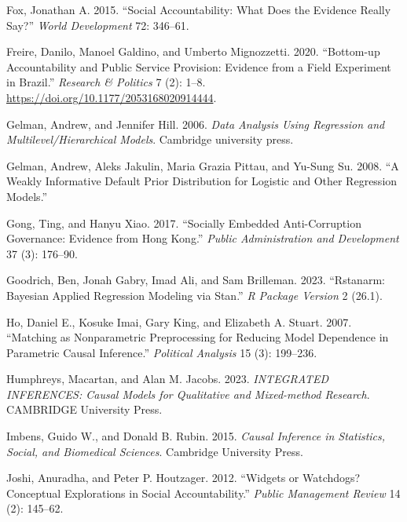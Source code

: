 \documentclass[]{AEA}
\newlength{\cslhangindent}
\newlength{\cslentryspacingunit} %
\newenvironment{CSLReferences}[2] %
 {%
  \setlength{\parindent}{0pt}
  \ifodd #1
  \let\oldpar\par
  \def\par{\hangindent=\cslhangindent\oldpar}
  \fi
  \setlength{\parskip}{#2\cslentryspacingunit}
 }%
 {}
\begin{document}
\begin{CSLReferences}{1}{0}
\leavevmode{}%
Fox, Jonathan A. 2015. {``Social Accountability: What Does the Evidence
Really Say?''} \emph{World Development} 72: 346--61.

\leavevmode{}%
Freire, Danilo, Manoel Galdino, and Umberto Mignozzetti. 2020.
{``Bottom-up Accountability and Public Service Provision: {Evidence}
from a Field Experiment in {Brazil}.''} \emph{Research \& Politics} 7
(2): 1--8. \url{https://doi.org/10.1177/2053168020914444}.

\leavevmode{}%
Gelman, Andrew, and Jennifer Hill. 2006. \emph{Data Analysis Using
Regression and Multilevel/Hierarchical Models}. {Cambridge university
press}.

\leavevmode{}%
Gelman, Andrew, Aleks Jakulin, Maria Grazia Pittau, and Yu-Sung Su.
2008. {``A Weakly Informative Default Prior Distribution for Logistic
and Other Regression Models.''}

\leavevmode{}%
Gong, Ting, and Hanyu Xiao. 2017. {``Socially Embedded Anti-Corruption
Governance: {Evidence} from {Hong Kong}.''} \emph{Public Administration
and Development} 37 (3): 176--90.

\leavevmode{}%
Goodrich, Ben, Jonah Gabry, Imad Ali, and Sam Brilleman. 2023.
{``Rstanarm: {Bayesian} Applied Regression Modeling via {Stan}.''}
\emph{R Package Version} 2 (26.1).

\leavevmode{}%
Ho, Daniel E., Kosuke Imai, Gary King, and Elizabeth A. Stuart. 2007.
{``Matching as Nonparametric Preprocessing for Reducing Model Dependence
in Parametric Causal Inference.''} \emph{Political Analysis} 15 (3):
199--236.

\leavevmode{}%
Humphreys, Macartan, and Alan M. Jacobs. 2023. \emph{{INTEGRATED
INFERENCES}: {Causal Models} for {Qualitative} and {Mixed-method
Research}}. {CAMBRIDGE University Press}.

\leavevmode{}%
Imbens, Guido W., and Donald B. Rubin. 2015. \emph{Causal Inference in
Statistics, Social, and Biomedical Sciences}. {Cambridge University
Press}.

\leavevmode{}%
Joshi, Anuradha, and Peter P. Houtzager. 2012. {``Widgets or Watchdogs?
{Conceptual} Explorations in Social Accountability.''} \emph{Public
Management Review} 14 (2): 145--62.


\end{CSLReferences}
\end{document}
